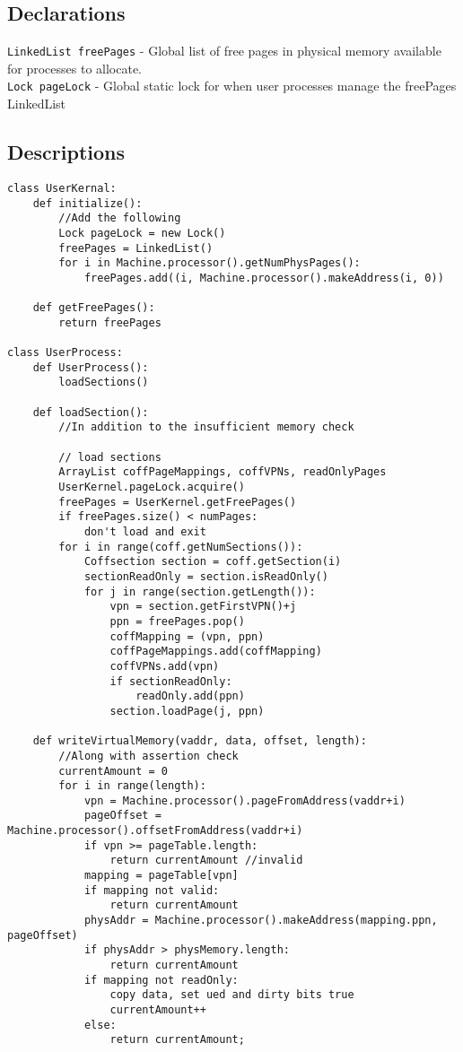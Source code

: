 \subsection{Declarations}
\texttt{LinkedList freePages} - Global list of free pages in physical memory available for processes to allocate. \\
\texttt{Lock pageLock} - Global static lock for when user processes manage the freePages LinkedList

\subsection{Descriptions}

\begin{verbatim}
class UserKernal:
    def initialize():
        //Add the following
        Lock pageLock = new Lock()
        freePages = LinkedList()
        for i in Machine.processor().getNumPhysPages():
            freePages.add((i, Machine.processor().makeAddress(i, 0))
            
    def getFreePages():
        return freePages
        
class UserProcess:
    def UserProcess():
        loadSections()
    
    def loadSection():
        //In addition to the insufficient memory check

        // load sections
        ArrayList coffPageMappings, coffVPNs, readOnlyPages
        UserKernel.pageLock.acquire()
        freePages = UserKernel.getFreePages()
        if freePages.size() < numPages:
            don't load and exit
        for i in range(coff.getNumSections()):
            Coffsection section = coff.getSection(i)
            sectionReadOnly = section.isReadOnly()
            for j in range(section.getLength()):
                vpn = section.getFirstVPN()+j
                ppn = freePages.pop()
                coffMapping = (vpn, ppn)
                coffPageMappings.add(coffMapping)
                coffVPNs.add(vpn)
                if sectionReadOnly:
                    readOnly.add(ppn)
                section.loadPage(j, ppn)
    
    def writeVirtualMemory(vaddr, data, offset, length):
        //Along with assertion check
        currentAmount = 0
        for i in range(length):
            vpn = Machine.processor().pageFromAddress(vaddr+i)
            pageOffset = Machine.processor().offsetFromAddress(vaddr+i)
            if vpn >= pageTable.length:
                return currentAmount //invalid
            mapping = pageTable[vpn]
            if mapping not valid:
                return currentAmount
            physAddr = Machine.processor().makeAddress(mapping.ppn, pageOffset)
            if physAddr > physMemory.length:
                return currentAmount
            if mapping not readOnly:
                copy data, set ued and dirty bits true
                currentAmount++
            else:
                return currentAmount;


\end{verbatim}

